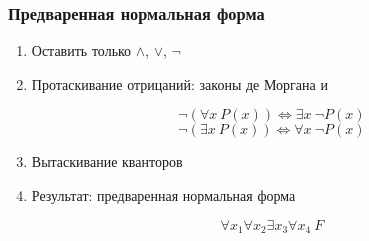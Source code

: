\documentclass[24pt,pdf,hyperref={unicode}]{beamer}
\begin{document}
\begin{frame}\frametitle{Предваренная нормальная форма}
\begin{enumerate}
\item<1-> Оставить только $\wedge$, $\vee$, $\neg$
\item<2-> Протаскивание отрицаний: законы де Моргана и

$$
\neg(\forall x\ P(x))\Leftrightarrow \exists x\ \neg P(x)
$$
$$
\neg(\exists x\ P(x))\Leftrightarrow \forall x\ \neg P(x)
$$
\item<3-> { Вытаскивание кванторов }

\begin{center}






\end{center}
\item<9-> Результат: предваренная нормальная форма

$$
\forall x_1 \forall x_2 \exists x_3 \forall x_4\ F
$$
\end{enumerate}

\end{frame}
\end{document}
